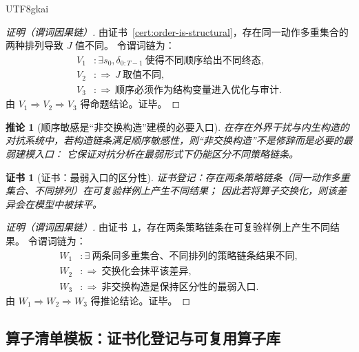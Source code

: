 \documentclass[12pt]{article}
\newtheorem{corollary}{推论}[section]
\newtheorem{Certificate}{证书}[section]
\begin{document}
\begin{CJK*}{UTF8}{gkai}
\begin{proof}[证明（谓词因果链）]
由证书~\ref{cert:order-is-structural}，存在同一动作多重集合的两种排列导致 $J$ 值不同。
令谓词链为：
\[
\begin{aligned}
  V_1 &: \exists s_0,\delta_{0:T-1}\ \text{使得不同顺序给出不同终态},\\
  V_2 &: \Rightarrow\ J\ \text{取值不同},\\
  V_3 &: \Rightarrow\ \text{顺序必须作为结构变量进入优化与审计}.
\end{aligned}
\]
由 $V_1\Rightarrow V_2\Rightarrow V_3$ 得命题结论。证毕。
\end{proof}

\begin{corollary}[顺序敏感是“非交换构造”建模的必要入口]
\label{cor:noncommutative-modeling-necessary}
在存在外界干扰与内生构造的对抗系统中，若构造链条满足顺序敏感性，则“非交换构造”不是修辞而是必要的最弱建模入口：
它保证对抗分析在最弱形式下仍能区分不同策略链条。
\end{corollary}

\begin{Certificate}[证书：最弱入口的区分性]
\label{cert:noncommutative-modeling-necessary}
证书登记：存在两条策略链条（同一动作多重集合、不同排列）在可复验样例上产生不同结果；
因此若将算子交换化，则该差异会在模型中被抹平。
\end{Certificate}

\begin{proof}[证明（谓词因果链）]
由证书~\ref{cert:noncommutative-modeling-necessary}，存在两条策略链条在可复验样例上产生不同结果。
令谓词链为：
\[
\begin{aligned}
  W_1 &: \exists\ \text{两条同多重集合、不同排列的策略链条结果不同},\\
  W_2 &: \Rightarrow\ \text{交换化会抹平该差异},\\
  W_3 &: \Rightarrow\ \text{非交换构造是保持区分性的最弱入口}.
\end{aligned}
\]
由 $W_1\Rightarrow W_2\Rightarrow W_3$ 得推论结论。证毕。
\end{proof}

\subsection{算子清单模板：证书化登记与可复用算子库}
\label{sec:operator-library-template}


\end{CJK*}
\end{document}
